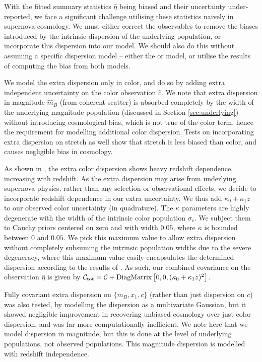 \documentclass[a4paper,fleqn,usenatbib]{mnras}
\newcommand{\green}{\color{forestgreen}}
\newcommand{\gten}{\citetalias{Guy2010}}
\newcommand{\celeven}{\citetalias{Chotard2011}}
\begin{document}
With the {\green fitted summary statistics $\hat{\eta}$ being biased and their uncertainty under-reported, we face a significant challenge utilising these statistics naively in supernova cosmology}. We must either correct the observables to remove the biases introduced by the intrinsic dispersion of the underlying population, or incorporate this dispersion into our model. We {\green should also} do this without assuming a specific dispersion model -- either the {\gten} or {\celeven} model, {\green or utilise the results of computing the bias from both models.}

We model the extra dispersion only in color, and do so by adding extra independent uncertainty on the color observation {\green $\hat{c}$}. We note that extra dispersion in magnitude {\green $\hat{m}_B$} (from coherent scatter) is absorbed completely by the width of the underlying magnitude population (discussed in Section \ref{sec:underlying}) without introducing cosmological bias, which is not true of the color term, hence the requirement for modelling additional color dispersion. Tests on incorporating extra dispersion on stretch as well show that stretch is less biased than color, and causes negligible bias in cosmology.

As shown in \citep{Kessler2013}, the extra color dispersion shows heavy redshift dependence, increasing with redshift. As the extra dispersion may arise from underlying supernova physics, rather than {\green any selection or observational effects}, we decide to incorporate redshift dependence in our extra uncertainty. We thus add $\kappa_0 + \kappa_1 z$ to our observed color uncertainty (in quadrature). The $\kappa$ parameters are highly degenerate with the width of the intrinsic color population $\sigma_c$. We subject them to Cauchy priors centered on zero and with width $0.05$, where $\kappa$ is bounded between $0$ and $0.05$. We pick this maximum value to allow extra dispersion without completely subsuming the intrinsic population widths due to the severe degeneracy, where this maximum value easily encapsulates the determined dispersion according to the results of \citet{Kessler2013}. As such, our combined covariance on the observation $\hat{\eta}$ is given by $\mathcal{C}_{\rm tot} = \mathcal{C} + {\rm DiagMatrix}\left[0, 0, (\kappa_0 + \kappa_1 z)^2\right]$. 

Fully covariant extra dispersion on $\lbrace m_B, x_1, c \rbrace$ (rather than just dispersion on $c$) was also tested, by modelling the dispersion as a multivariate Gaussian, but it showed negligible improvement in recovering unbiased cosmology over just color dispersion, and was far more computationally inefficient. We note here that we model dispersion in magnitude, but this is done at the level of underlying populations, not observed populations. This magnitude dispersion is modelled with redshift independence.
\end{document}
